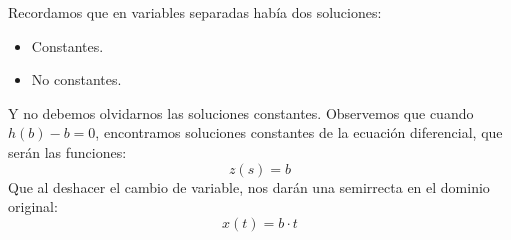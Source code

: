 Recordamos que en variables separadas había dos soluciones:
\begin{itemize}
    \item Constantes.
    \item No constantes.
\end{itemize}
Y no debemos olvidarnos las soluciones constantes.
Observemos que cuando $h(b)-b=0$, encontramos soluciones constantes de la ecuación diferencial, que serán las funciones:
\begin{equation*}
    z(s) = b
\end{equation*}
Que al deshacer el cambio de variable, nos darán una semirrecta en el dominio original:
\begin{equation*}
    x(t) = b\cdot t
\end{equation*}

